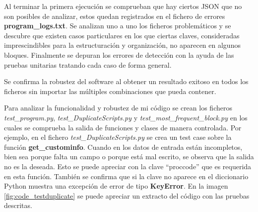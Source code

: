 \documentclass[a4paper, 12pt]{book}
\begin{document}
Al terminar la primera ejecución se comprueban que hay ciertos JSON que no son posibles de analizar, estos quedan registrados en el fichero de errores \textbf{program\_logs.txt}. Se analizan uno a uno los ficheros problemáticos y se descubre que existen casos particulares en los que ciertas claves, consideradas imprescindibles para la estructuración y organización, no aparecen en algunos bloques. Finalmente se depuran los errores de detección con la ayuda de las pruebas unitarias tratando cada caso de forma general. 

Se confirma la robustez del software al obtener un resultado exitoso en todos los ficheros sin importar las múltiples combinaciones que pueda contener.

Para analizar la funcionalidad y robustez de mi código se crean los ficheros \textit{test\_program.py}, \textit{test\_DuplicateScripts.py} y \textit{test\_most\_frequent\_block.py} en los cuales se comprueba la salida de funciones y clases de manera controlada. Por ejemplo, en el fichero \textit{test\_DuplicateScripts.py} se crea un test case sobre la función \textbf{get\_custominfo}. Cuando en los datos de entrada están incompletos, bien sea porque falta un campo o porque está mal escrito, se observa que la salida no es la deseada. Esto se puede apreciar con la clave ``proccode'' que es requerida en esta función. También se confirma que si la clave no aparece en el diccionario Python muestra una excepción de error de tipo \textbf{KeyError}. En la imagen \ref{fig:code_testduplicate} se puede apreciar un extracto del código con las pruebas descritas.
\end{document}
